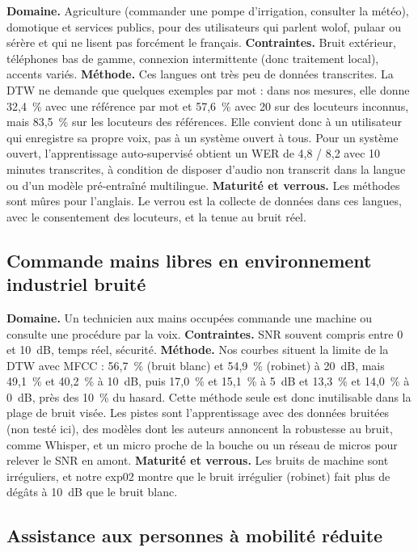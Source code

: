 \textbf{Domaine.} Agriculture (commander une pompe d'irrigation, consulter la météo), domotique et services publics, pour des utilisateurs qui parlent wolof, pulaar ou sérère et qui ne lisent pas forcément le français. \textbf{Contraintes.} Bruit extérieur, téléphones bas de gamme, connexion intermittente (donc traitement local), accents variés. \textbf{Méthode.} Ces langues ont très peu de données transcrites. La DTW ne demande que quelques exemples par mot : dans nos mesures, elle donne 32,4~\% avec une référence par mot et 57,6~\% avec 20 sur des locuteurs inconnus, mais 83,5~\% sur les locuteurs des références. Elle convient donc à un utilisateur qui enregistre sa propre voix, pas à un système ouvert à tous. Pour un système ouvert, l'apprentissage auto-supervisé obtient un WER de 4,8 / 8,2 avec 10 minutes transcrites, à condition de disposer d'audio non transcrit dans la langue ou d'un modèle pré-entraîné multilingue. \textbf{Maturité et verrous.} Les méthodes sont mûres pour l'anglais. Le verrou est la collecte de données dans ces langues, avec le consentement des locuteurs, et la tenue au bruit réel.

\subsection{Commande mains libres en environnement industriel bruité}

\textbf{Domaine.} Un technicien aux mains occupées commande une machine ou consulte une procédure par la voix. \textbf{Contraintes.} SNR souvent compris entre 0 et 10~dB, temps réel, sécurité. \textbf{Méthode.} Nos courbes situent la limite de la DTW avec MFCC : 56,7~\% (bruit blanc) et 54,9~\% (robinet) à 20~dB, mais 49,1~\% et 40,2~\% à 10~dB, puis 17,0~\% et 15,1~\% à 5~dB et 13,3~\% et 14,0~\% à 0~dB, près des 10~\% du hasard. Cette méthode seule est donc inutilisable dans la plage de bruit visée. Les pistes sont l'apprentissage avec des données bruitées (non testé ici), des modèles dont les auteurs annoncent la robustesse au bruit, comme Whisper, et un micro proche de la bouche ou un réseau de micros pour relever le SNR en amont. \textbf{Maturité et verrous.} Les bruits de machine sont irréguliers, et notre exp02 montre que le bruit irrégulier (robinet) fait plus de dégâts à 10~dB que le bruit blanc.

\subsection{Assistance aux personnes à mobilité réduite}

